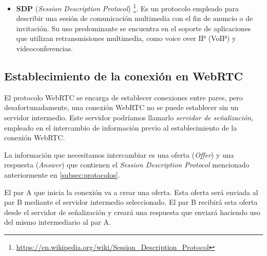 \documentclass[a4paper, 12pt]{book}
\begin{document}
\begin{itemize}
\item \textbf{SDP} (\textit{Session Description Protocol}) \footnote{\url{https://en.wikipedia.org/wiki/Session_Description_Protocol}}. Es un protocolo empleado para describir una sesión de comunicación multimedia con el fin de anuncio o de invitación. Su uso predominante se encuentra en el soporte de aplicaciones que utilizan retransmisiones multimedia, como voice over IP (VoIP) y videoconferencias.

\end{itemize}

\subsection{Establecimiento de la conexión en WebRTC}
\label{subsec:establecimiento_conexion}

El protocolo WebRTC se encarga de establecer conexiones entre pares, pero desafortunadamente, una conexión WebRTC no se puede establecer sin un servidor intermedio. Este servidor podríamos llamarlo \emph{servidor de señalización}, empleado en el intercambio de información previo al establecimiento de la conexión WebRTC.

La información que necesitamos intercambiar es una oferta (\textit{Offer}) y una respuesta (\textit{Answer}) que contienen el \textit{Session Description Protocol} mencionado anteriormente en \ref{subsec:protocolos}.

El par A que inicia la conexión va a crear una oferta. Esta oferta será enviada al par B mediante el servidor intermedio seleccionado. El par B recibirá esta oferta desde el servidor de señalización y creará una respuesta que enviará haciendo uso del mismo intermediario al par A.
\end{document}
